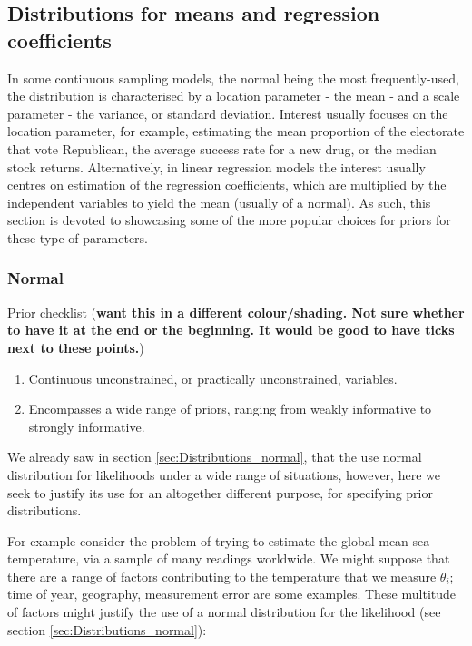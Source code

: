 \documentclass[11pt,fullpage]{book}
\begin{document}
\subsection{Distributions for means and regression coefficients}
In some continuous sampling models, the normal being the most frequently-used, the distribution is characterised by a location parameter - the mean - and a scale parameter - the variance, or standard deviation. Interest usually focuses on the location parameter, for example, estimating the mean proportion of the electorate that vote Republican, the average success rate for a new drug, or the median stock returns. Alternatively, in linear regression models the interest usually centres on estimation of the regression coefficients, which are multiplied by the independent variables to yield the mean (usually of a normal). As such, this section is devoted to showcasing some of the more popular choices for priors for these type of parameters.

\subsubsection{Normal}
Prior checklist (\textbf{want this in a different colour/shading. Not sure whether to have it at the end or the beginning. It would be good to have ticks next to these points.})

\begin{enumerate} 
\item Continuous unconstrained, or practically unconstrained, variables.
\item Encompasses a wide range of priors, ranging from weakly informative to strongly informative.
\end{enumerate}

We already saw in section \ref{sec:Distributions_normal}, that the use normal distribution for likelihoods under a wide range of situations, however, here we seek to justify its use for an altogether different purpose, for specifying prior distributions. 

For example consider the problem of trying to estimate the global mean sea temperature, via a sample of many readings worldwide. We might suppose that there are a range of factors contributing to the temperature that we measure $\theta_i$; time of year, geography, measurement error are some examples. These multitude of factors might justify the use of a normal distribution for the likelihood (see section \ref{sec:Distributions_normal}):
\end{document}
